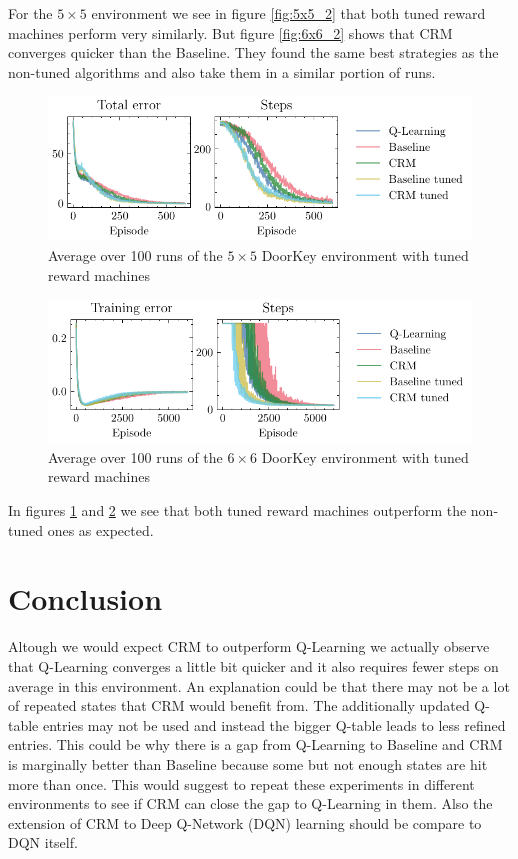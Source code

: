 \documentclass[12pt, a4paper]{article}
\begin{document}
For the $5 \times 5$ environment we see in figure \ref{fig:5x5_2} that both tuned reward machines perform very similarly. But figure \ref{fig:6x6_2} shows that CRM converges quicker than the Baseline. They found the same best strategies as the non-tuned algorithms and also take them in a similar portion of runs.

\begin{figure}[ht!]
	\centering
	\includegraphics[width=\textwidth]{figures/cmp3_5x5.pdf}
	\caption{Average over 100 runs of the $5 \times 5$ DoorKey environment with tuned reward machines}
	\label{fig:5x5_3}
\end{figure}

\begin{figure}[ht!]
	\centering
	\includegraphics[width=\textwidth]{figures/cmp3_6x6.pdf}
	\caption{Average over 100 runs of the $6 \times 6$ DoorKey environment with tuned reward machines}
	\label{fig:6x6_3}
\end{figure}

In figures \ref{fig:5x5_3} and \ref{fig:6x6_3} we see that both tuned reward machines outperform the non-tuned ones as expected.

\section*{Conclusion}

Altough we would expect CRM to outperform Q-Learning we actually observe that Q-Learning converges a little bit quicker and it also requires fewer steps on average in this environment. An explanation could be that there may not be a lot of repeated states that CRM would benefit from. The additionally updated Q-table entries may not be used and instead the bigger Q-table leads to less refined entries. This could be why there is a gap from Q-Learning to Baseline and CRM is marginally better than Baseline because some but not enough states are hit more than once. This would suggest to repeat these experiments in different environments to see if CRM can close the gap to Q-Learning in them. Also the extension of CRM to Deep Q-Network (DQN) learning should be compare to DQN itself.
\end{document}
